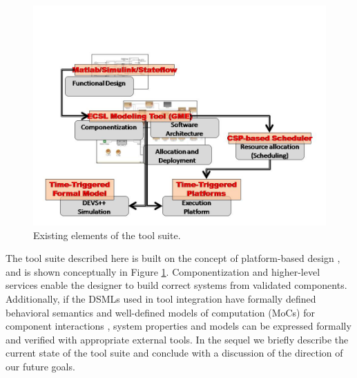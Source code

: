 \begin{figure}[h]
   \includegraphics[width=0.9\columnwidth]{existing}
   \caption{Existing elements of the tool suite.}
   \label{fig:existing}
\end{figure}

The tool suite described here is built on the concept of platform-based
design \cite{alberto:2002}, and is shown conceptually in Figure \ref{fig:existing}.  
Componentization and higher-level services enable the designer to build 
correct systems from validated components.  Additionally, if the DSMLs used in 
tool integration have formally defined behavioral semantics and well-defined 
models of computation (MoCs) for component interactions \cite{Lee:M97/11}, system 
properties and models can be expressed formally and verified with appropriate 
external tools.  In the sequel we briefly describe the current state of the tool 
suite and conclude with a discussion of the direction of our future goals.

